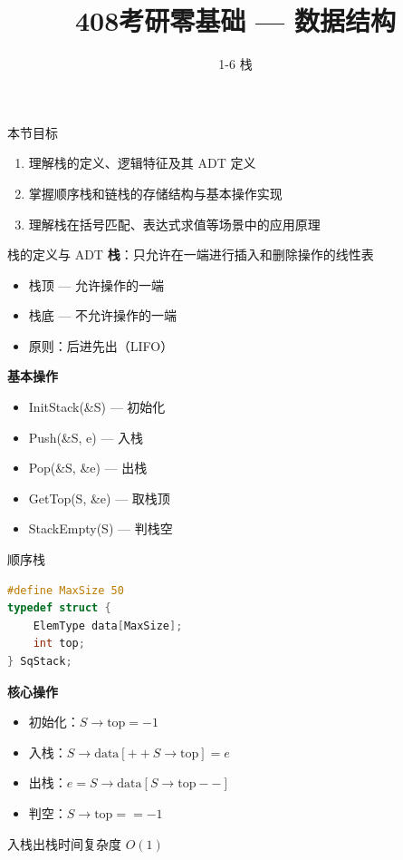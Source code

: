 \documentclass[10pt, aspectratio=169]{beamer}
\title{408考研零基础 --- 数据结构}
\subtitle{1-6 栈}
\author{}
\date{}
\begin{document}
\begin{frame}{本节目标}
    \begin{enumerate}
        \item 理解栈的定义、逻辑特征及其 ADT 定义
        \item 掌握顺序栈和链栈的存储结构与基本操作实现
        \item 理解栈在括号匹配、表达式求值等场景中的应用原理
    \end{enumerate}
\end{frame}

\begin{frame}{栈的定义与 ADT}
    \textbf{栈}：只允许在一端进行插入和删除操作的线性表
    \begin{itemize}
        \item 栈顶 --- 允许操作的一端
        \item 栈底 --- 不允许操作的一端
        \item 原则：后进先出（LIFO）
    \end{itemize}
    \vspace{0.5em}
    \textbf{基本操作}
    \begin{itemize}
        \item InitStack(\&S) --- 初始化
        \item Push(\&S, e) --- 入栈
        \item Pop(\&S, \&e) --- 出栈
        \item GetTop(S, \&e) --- 取栈顶
        \item StackEmpty(S) --- 判栈空
    \end{itemize}
\end{frame}

\begin{frame}[fragile]{顺序栈}
    \begin{lstlisting}[language=C, basicstyle=\ttfamily\small]
#define MaxSize 50
typedef struct {
    ElemType data[MaxSize];
    int top;
} SqStack;
    \end{lstlisting}
    \vspace{0.5em}
    \textbf{核心操作}
    \begin{itemize}
        \item 初始化：$S \to \text{top} = -1$
        \item 入栈：$S \to \text{data}[++S \to \text{top}] = e$
        \item 出栈：$e = S \to \text{data}[S \to \text{top}--]$
        \item 判空：$S \to \text{top} == -1$
    \end{itemize}
    \vspace{0.3em}
    入栈出栈时间复杂度 $O(1)$
\end{frame}
\end{document}

